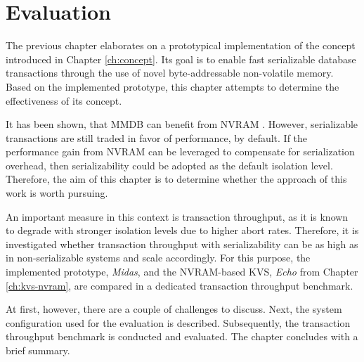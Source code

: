 \chapter{Evaluation}
\label{ch:eval}

The previous chapter elaborates on a prototypical implementation of the concept
introduced in Chapter \ref{ch:concept}. Its goal is to enable fast serializable
database transactions through the use of novel byte-addressable non-volatile
memory. Based on the implemented prototype, this chapter attempts to determine
the effectiveness of its concept.

It has been shown, that MMDB can benefit from NVRAM \cite{bailey2013exploring,
schwalb2016hyrise, oukid2017data, andrei2017sap}. However, serializable
transactions are still traded in favor of performance, by default. If the
performance gain from NVRAM can be leveraged to compensate for serialization
overhead, then serializability could be adopted as the default isolation level.
Therefore, the aim of this chapter is to determine whether the approach of this
work is worth pursuing.

An important measure in this context is transaction throughput, as it is known
to degrade with stronger isolation levels due to higher abort rates. Therefore,
it is investigated whether transaction throughput with serializability can be as
high as in non-serializable systems and scale accordingly. For this purpose, the
implemented prototype, \emph{Midas}, and the NVRAM-based KVS, \emph{Echo} from
Chapter \ref{ch:kvs-nvram}, are compared in a dedicated transaction throughput
benchmark.



At first, however, there are a couple of challenges to discuss. Next, the system
configuration used for the evaluation is described. Subsequently, the
transaction throughput benchmark is conducted and evaluated. The chapter
concludes with a brief summary.

